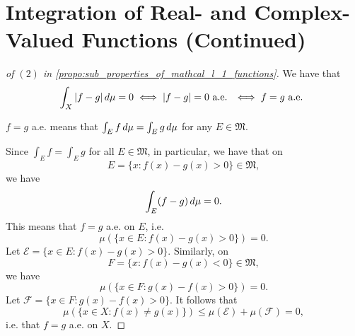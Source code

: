 \documentclass[notoc,notitlepage]{tufte-book}
\begin{document}
\section{Integration of Real- and Complex-Valued Functions (Continued)}%
\label{sec:integration_of_real_and_complex_valued_functions_continued}

\begin{proof}[of $(2)$ in \cref{propo:sub_properties_of_mathcal_l_1_functions}]
  We have that
  \begin{equation*}
    \int_{X} \left|f - g\right| \mathop{}\!d{\mu} = 0
    \iff \left|f - g\right| = 0 \text{ a.e. }
    \iff f = g \text{ a.e. }
  \end{equation*}

  \noindent
  $f = g$ a.e. means that $\int_{E} f \mathop{}\!d{\mu} = \int_{E} g \mathop{}\!d{\mu}$ for any
  $E \in \mathfrak{M}$.

  \noindent
  Since $\int_{E} f = \int_{E} g$ for all $E \in \mathfrak{M}$,
  in particular, we have that on
  \begin{equation*}
    E = \{ x : f(x) - g(x) > 0 \} \in \mathfrak{M},
  \end{equation*}
  we have
  \begin{equation*}
    \int_{E} (f - g) \mathop{}\!d{\mu} = 0.
  \end{equation*}
  This means that $f = g$ a.e. on $E$, i.e.
  \begin{equation*}
    \mu(\{ x \in E : f(x) - g(x) > 0 \}) = 0.
  \end{equation*}
  Let $\mathcal{E} = \{ x \in E : f(x) - g(x) > 0 \}$.
  Similarly, on
  \begin{equation*}
    F = \{ x : f(x) - g(x) < 0 \} \in \mathfrak{M},
  \end{equation*}
  we have
  \begin{equation*}
    \mu(\{ x \in F : g(x) - f(x) > 0 \}) = 0.
  \end{equation*}
  Let $\mathcal{F} = \{ x \in F : g(x) - f(x) > 0 \}$.
  It follows that
  \begin{equation*}
    \mu(\{ x \in X : f(x) \neq g(x) \})
    \leq \mu(\mathcal{E}) + \mu(\mathcal{F}) = 0,
  \end{equation*}
  i.e. that $f = g$ a.e. on $X$.
\end{proof}
\end{document}
